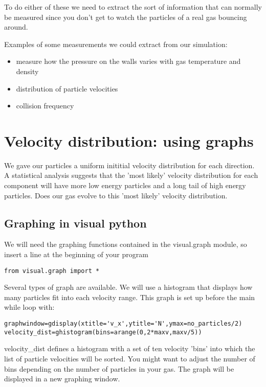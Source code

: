 \documentclass[a4paper]{letter}
\begin{document}
To do either of these we need to extract the sort of information that can normally 
be measured since you don't get to watch the particles of a real gas bouncing around.

Examples of some measurements we could extract from our simulation:
\begin{itemize}
\item{measure how the pressure on the walls varies with gas temperature and density}
\item{distribution of particle velocities}
\item{collision frequency}
\end{itemize}
\section{Velocity distribution: using graphs}
We gave our particles a uniform inititial velocity distribution for each direction. 
A statistical analysis suggests that the 'most likely' velocity distribution for each 
component will have more low energy particles and a long tail of high energy particles. 
Does our gas evolve to this 'most likely' velocity distribution.

\subsection{Graphing in visual python}
We will need the graphing functions contained in the visual.graph module, so insert a line 
at the beginning of your program
{\color{code}\begin{verbatim}
from visual.graph import *
\end{verbatim}}
Several types of graph are available. 
We will use a histogram that displays how many particles fit into each velocity range. 
This graph is set up before the main while loop with:
{\color{code}\begin{verbatim}
graphwindow=gdisplay(xtitle='v_x',ytitle='N',ymax=no_particles/2)
velocity_dist=ghistogram(bins=arange(0,2*maxv,maxv/5))
\end{verbatim}}
velocity\_dist defines a histogram with a set of ten velocity 'bins' into which the list of 
particle velocities will be sorted. 
You might want to adjust the number of bins depending on the number of particles in your gas. 
The graph will be displayed in a new graphing window. 
\end{document}
